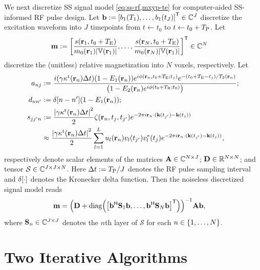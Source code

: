 We next discretize SS signal model \eqref{eq:ss-rf,mxyp-te}
for computer-aided SS-informed RF pulse design.
Let $\bmb := \brac{\bone(\To), \dots, \bone(t_J)}\tpose \in \complexes{J}$
discretize the excitation waveform into $J$ timepoints
from $t\gets t_0$ 
to $t \gets t_0 + T_\mathrm{P}$.
Let 
\begin{align}
	\mathbf{m} &:= 
		\brac{\frac{s(\bmr_1, t_0+\TE)}{\mzero(\bmr_1)\abs{\setV\paren{\bmr_1}}}, 
		\dots, 
		\frac{s(\bmr_N, t_0+\TE)}{\mzero(\bmr_N)\abs{\setV\paren{\bmr_1}}}}\tpose 
		\in \complexes{N}
	\label{eq:ss-rf,m}
\end{align}
discretize the (unitless) relative magnetization
into $N$ voxels, respectively. 
Let 
\begin{align}
	a_{nj} &:=
		\frac{i (\gam \stx(\bmr_n) \Delta t)  
		(1-\Eo(\bmr_n)) e^{i \phi(\bmr_n, t_0 + \TE; t_j)} e^{-(t_0+\TE-t_j)/\Tt(\bmr_n)}}
		{\paren{1 - \Et(\bmr_n) e^{i \phi(t_0 + \TR; t_0)}}}; 
		\label{eq:ss-rf,anj} 
		\\
	d_{n{n'}} &:=
		\delta[n - n'] \paren{1 - \Eo(\bmr_n)}; 
		\label{eq:ss-rf,dnn} \\
	s_{j{j'}n} &:=	
		\frac{\abs{\gam \stx(\bmr_n) \Delta t}^2}{2} 
		\zeta(\bmr_n, t_j, t_{j'}) e^{-2\pi i \bmr_n \cdot 
		(\bmk(t_{j'}) - \bmk(t_j))} 
		\nonumber 
		\\
	&\approx
		\frac{\abs{\gam \stx(\bmr_n) \Delta t}^2}{2} 
		\sum_{l=1}^L u_l(\bmr_n) v_l(t_{j'}) v_l^*(t_j) 
		e^{-2\pi i\bmr_n \cdot (\bmk(t_{j'}) - \bmk(t_j))},
		\label{eq:ss-rf,sjjn}
\end{align}
respectively denote scalar elements 
of the matrices 
$\mathbf{A} \in \mathbb{C}^{N \times J}$;
$\mathbf{D} \in \mathbb{R}^{N \times N}$;
and tensor $\mathcal{S} \in \mathbb{C}^{J \times J \times N}$.
Here $\Delta t := T_\mathrm{P}/J$ denotes the RF pulse sampling interval
and $\delta\brac{\cdot}$ denotes the Kronecker delta function.
Then the noiseless discretized signal model reads
\begin{align}
	\mathbf{m} &= 
		\inv{\bmD + \diag{\brac{\bmb\ctpose\bmS_1\bmb,\dots,\bmb\ctpose\bmS_N\bmb}\tpose}}
		\bmA \bmb,
	\label{eq:ss-rf,discrete}
\end{align}
where $\mathbf{S}_n \in \mathbb{C}^{J \times J}$
denotes the $n$th layer of $\mathcal{S}$
for each $n \in \set{1,\dots,N}$.
	
\section{Two Iterative Algorithms}
\label{s,ss-rf,alg}


